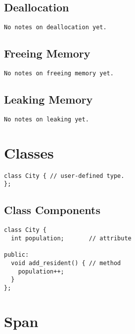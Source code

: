 \subsection{Deallocation}
\begin{verbatim}
No notes on deallocation yet.
\end{verbatim}

\subsection{Freeing Memory}
\begin{verbatim}
No notes on freeing memory yet.
\end{verbatim}

\subsection{Leaking Memory}
\begin{verbatim}
No notes on leaking yet.
\end{verbatim}

\section{Classes}

\begin{verbatim}
class City { // user-defined type.
};
\end{verbatim}

\subsection{Class Components}

\begin{verbatim}
class City {
  int population;       // attribute
 
public:
  void add_resident() { // method
    population++;
  }
};
\end{verbatim}

\section{Span}

